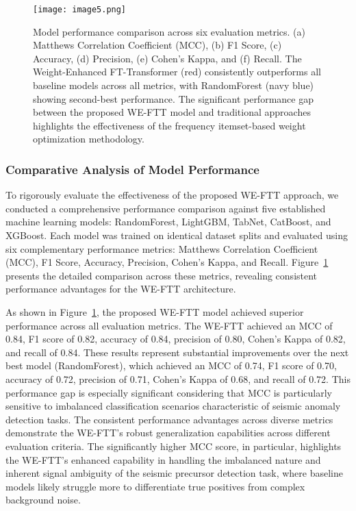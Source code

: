 \documentclass[fleqn,10pt]{wlscirep_mdpi_style}
\begin{document}
\begin{figure}[!htbp]
\centering
 \texttt{[image: image5.png]}
\caption{Model performance comparison across six evaluation metrics. (a) Matthews Correlation Coefficient (MCC), (b) F1 Score, (c) Accuracy, (d) Precision, (e) Cohen's Kappa, and (f) Recall. The Weight-Enhanced FT-Transformer (red) consistently outperforms all baseline models across all metrics, with RandomForest (navy blue) showing second-best performance. The significant performance gap between the proposed WE-FTT model and traditional approaches highlights the effectiveness of the frequency itemset-based weight optimization methodology.}
\label{fig:fig5}
\end{figure}

\subsubsection{Comparative Analysis of Model Performance}
To rigorously evaluate the effectiveness of the proposed WE-FTT approach, we conducted a comprehensive performance comparison against five established machine learning models: RandomForest, LightGBM, TabNet, CatBoost, and XGBoost. Each model was trained on identical dataset splits and evaluated using six complementary performance metrics: Matthews Correlation Coefficient (MCC), F1 Score, Accuracy, Precision, Cohen's Kappa, and Recall. Figure~\ref{fig:fig5} presents the detailed comparison across these metrics, revealing consistent performance advantages for the WE-FTT architecture.

As shown in Figure~\ref{fig:fig5}, the proposed WE-FTT model achieved superior performance across all evaluation metrics. The WE-FTT achieved an MCC of 0.84, F1 score of 0.82, accuracy of 0.84, precision of 0.80, Cohen's Kappa of 0.82, and recall of 0.84. These results represent substantial improvements over the next best model (RandomForest), which achieved an MCC of 0.74, F1 score of 0.70, accuracy of 0.72, precision of 0.71, Cohen's Kappa of 0.68, and recall of 0.72. This performance gap is especially significant considering that MCC is particularly sensitive to imbalanced classification scenarios characteristic of seismic anomaly detection tasks. The consistent performance advantages across diverse metrics demonstrate the WE-FTT's robust generalization capabilities across different evaluation criteria. The significantly higher MCC score, in particular, highlights the WE-FTT's enhanced capability in handling the imbalanced nature and inherent signal ambiguity of the seismic precursor detection task, where baseline models likely struggle more to differentiate true positives from complex background noise.
\end{document}
